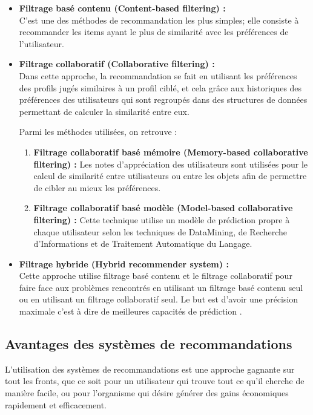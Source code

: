 \begin{itemize}
    \item \textbf{Filtrage basé contenu (Content-based filtering) :\\}
    C'est une des méthodes de recommandation les plus simples; elle consiste à recommander les items ayant le plus de similarité avec les préférences de l'utilisateur.\\
    
    \item \textbf{Filtrage collaboratif (Collaborative filtering) :\\}
     Dans cette approche, la recommandation se fait en utilisant les préférences des profils jugés similaires à un profil ciblé, et cela grâce aux historiques des préférences des utilisateurs qui sont regroupés dans des structures de données permettant de calculer la similarité entre eux. 

     Parmi les méthodes utilisées, on retrouve :
    \begin{enumerate}
        \item \textbf{Filtrage collaboratif basé mémoire (Memory-based collaborative filtering) : }Les notes d'appréciation des utilisateurs sont utilisées pour le calcul de similarité entre utilisateurs ou entre les objets afin de permettre de cibler au mieux les préférences.\\
        \item \textbf{Filtrage collaboratif basé modèle (Model-based collaborative filtering) : }Cette technique utilise un modèle de prédiction propre à chaque utilisateur selon les techniques de DataMining, de Recherche d'Informations et de Traitement Automatique du Langage.\\
    \end{enumerate}
    
    \item \textbf{Filtrage hybride (Hybrid recommender system) :\\}
    Cette approche utilise filtrage basé contenu et le filtrage collaboratif pour faire face aux problèmes rencontrés en utilisant un filtrage basé contenu seul ou en utilisant un filtrage collaboratif seul. Le but est d'avoir une précision maximale c'est à dire de meilleures capacités de prédiction \cite{filtering}.
\end{itemize}

\subsection{Avantages des systèmes de recommandations}
L'utilisation des systèmes de recommandations est une approche gagnante sur tout les fronts, que ce soit pour un utilisateur qui trouve tout ce qu'il cherche de manière facile, ou pour l'organisme qui désire générer des gains économiques rapidement et efficacement.

